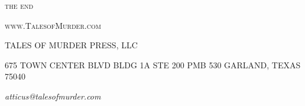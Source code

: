 \documentclass{novel}
\begin{document}
\vspace{2\nbs}
\clearpage
\thispagestyle{empty}


\scenebreak
\scenebreak
{\centering\textsc{the end}\par}

\clearpage

\null

\centering\textsc{www.TalesofMurder.com}\par

\vspace*{10\nbs}


TALES OF MURDER PRESS, LLC

\null

\scshape{675 TOWN CENTER BLVD
BLDG 1A STE 200 PMB 530
GARLAND, TEXAS 75040}

\null

\textit{atticus@talesofmurder.com}
\vfill
\end{document}
